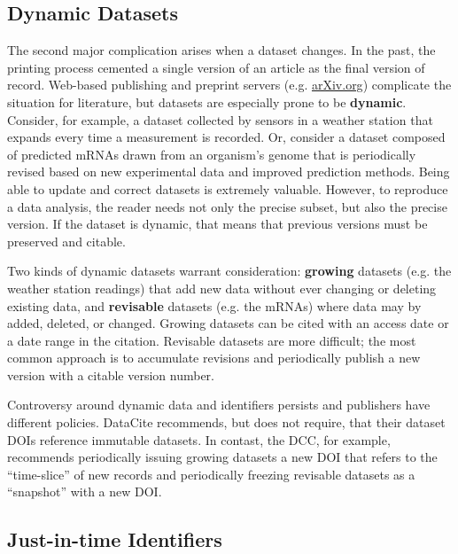 \documentclass[10pt,twocolumn]{article}
\begin{document}
\subsection*{Dynamic Datasets}\label{dynamic-data}

The second major complication arises when a dataset changes.
In the past, the printing process cemented a single version of an article as the final version of record.
Web-based publishing and preprint servers (e.g. \href{http://arxiv.org/}{arXiv.org}) complicate the situation for literature, but datasets are especially prone to be \textbf{dynamic}.
Consider, for example, a dataset collected by sensors in a weather station that expands every time a measurement is recorded.
Or, consider a dataset composed of predicted mRNAs drawn from an organism's genome that is periodically revised based on new experimental data and improved prediction methods. %
Being able to update and correct datasets is extremely valuable.
However, to reproduce a data analysis, the reader needs not only the precise subset, but also the precise version.
If the dataset is dynamic, that means that previous versions must be preserved and citable.

Two kinds of dynamic datasets warrant consideration: \textbf{growing} datasets (e.g. the weather station readings) that add new data without ever changing or deleting existing data, and \textbf{revisable} datasets (e.g. the mRNAs) where data may by added, deleted, or changed.  %
Growing datasets can be cited with an access date or a date range in the citation.
Revisable datasets are more difficult; the most common approach is to accumulate revisions and periodically publish a new version with a citable version number. %

Controversy around dynamic data and identifiers persists and publishers have different policies.
DataCite recommends, but does not require, that their dataset DOIs reference immutable datasets.
In contast, the DCC, for example, recommends periodically issuing growing datasets a new DOI that refers to the ``time-slice'' of new records and periodically freezing revisable datasets as a ``snapshot'' with a new DOI.

\subsection*{Just-in-time Identifiers}\label{just-in-time-identifiers}
\end{document}
